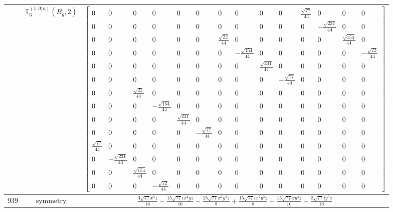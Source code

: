 \documentclass[fleqn,8pt,landscape]{jsarticle}
\begin{document}
\begin{longtable}{ccc}
$  $ & $ \mathbb{T}_{6}^{(1,0;a)}(B_{g},2) $ & $ \begin{bmatrix} 0 & 0 & 0 & 0 & 0 & 0 & 0 & 0 & 0 & 0 & \frac{\sqrt{77}}{44} & 0 & 0 & 0 \\ 0 & 0 & 0 & 0 & 0 & 0 & 0 & 0 & 0 & 0 & 0 & - \frac{\sqrt{231}}{44} & 0 & 0 \\ 0 & 0 & 0 & 0 & 0 & 0 & \frac{\sqrt{22}}{44} & 0 & 0 & 0 & 0 & 0 & \frac{\sqrt{154}}{44} & 0 \\ 0 & 0 & 0 & 0 & 0 & 0 & 0 & - \frac{\sqrt{154}}{44} & 0 & 0 & 0 & 0 & 0 & - \frac{\sqrt{22}}{44} \\ 0 & 0 & 0 & 0 & 0 & 0 & 0 & 0 & \frac{\sqrt{231}}{44} & 0 & 0 & 0 & 0 & 0 \\ 0 & 0 & 0 & 0 & 0 & 0 & 0 & 0 & 0 & - \frac{\sqrt{77}}{44} & 0 & 0 & 0 & 0 \\ 0 & 0 & \frac{\sqrt{22}}{44} & 0 & 0 & 0 & 0 & 0 & 0 & 0 & 0 & 0 & 0 & 0 \\ 0 & 0 & 0 & - \frac{\sqrt{154}}{44} & 0 & 0 & 0 & 0 & 0 & 0 & 0 & 0 & 0 & 0 \\ 0 & 0 & 0 & 0 & \frac{\sqrt{231}}{44} & 0 & 0 & 0 & 0 & 0 & 0 & 0 & 0 & 0 \\ 0 & 0 & 0 & 0 & 0 & - \frac{\sqrt{77}}{44} & 0 & 0 & 0 & 0 & 0 & 0 & 0 & 0 \\ \frac{\sqrt{77}}{44} & 0 & 0 & 0 & 0 & 0 & 0 & 0 & 0 & 0 & 0 & 0 & 0 & 0 \\ 0 & - \frac{\sqrt{231}}{44} & 0 & 0 & 0 & 0 & 0 & 0 & 0 & 0 & 0 & 0 & 0 & 0 \\ 0 & 0 & \frac{\sqrt{154}}{44} & 0 & 0 & 0 & 0 & 0 & 0 & 0 & 0 & 0 & 0 & 0 \\ 0 & 0 & 0 & - \frac{\sqrt{22}}{44} & 0 & 0 & 0 & 0 & 0 & 0 & 0 & 0 & 0 & 0 \end{bmatrix} $ \\ \hline
$ 939 $ & $ \text{symmetry} $ & $ \frac{3 \sqrt{77} x^{5} z}{16} - \frac{15 \sqrt{77} i x^{4} y z}{16} - \frac{15 \sqrt{77} x^{3} y^{2} z}{8} + \frac{15 \sqrt{77} i x^{2} y^{3} z}{8} + \frac{15 \sqrt{77} x y^{4} z}{16} - \frac{3 \sqrt{77} i y^{5} z}{16} $ \\

\end{longtable}
\end{document}
